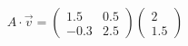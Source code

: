 \documentclass[preview]{standalone}
\begin{document}
\begin{align*}
A \cdot \vec{v} = \begin{pmatrix} 1.5 & 0.5 \\ -0.3 & 2.5 \end{pmatrix} \begin{pmatrix} 2 \\ 1.5 \end{pmatrix}
\end{align*}
\end{document}
